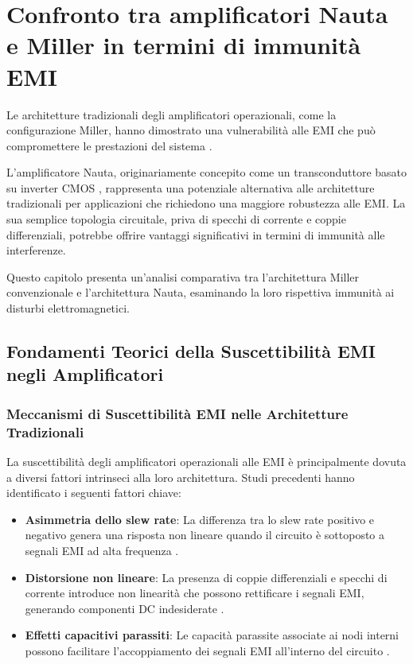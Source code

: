 \chapter{Confronto tra amplificatori Nauta e Miller in termini di immunità EMI}
\label{chap:Nauta_Miller_Comparison}

Le architetture tradizionali degli amplificatori operazionali, come la configurazione Miller, hanno dimostrato una vulnerabilità alle EMI che può compromettere le prestazioni del sistema \cite{TR2016}. 

L'amplificatore Nauta, originariamente concepito come un transconduttore basato su inverter CMOS \cite{EMI_Immunity_of_the_Nauta_Inverter-Based_Amplifier}, rappresenta una potenziale alternativa alle architetture tradizionali per applicazioni che richiedono una maggiore robustezza alle EMI. La sua semplice topologia circuitale, priva di specchi di corrente e coppie differenziali, potrebbe offrire vantaggi significativi in termini di immunità alle interferenze.

Questo capitolo presenta un'analisi comparativa tra l'architettura Miller convenzionale e l'architettura Nauta, esaminando la loro rispettiva immunità ai disturbi elettromagnetici.

\section{Fondamenti Teorici della Suscettibilità EMI negli Amplificatori}

\subsection{Meccanismi di Suscettibilità EMI nelle Architetture Tradizionali}

La suscettibilità degli amplificatori operazionali alle EMI è principalmente dovuta a diversi fattori intrinseci alla loro architettura. Studi precedenti hanno identificato i seguenti fattori chiave:

\begin{itemize}
    \item \textbf{Asimmetria dello slew rate}: La differenza tra lo slew rate positivo e negativo genera una risposta non lineare quando il circuito è sottoposto a segnali EMI ad alta frequenza \cite{finalprint}.
    
    \item \textbf{Distorsione non lineare}: La presenza di coppie differenziali e specchi di corrente introduce non linearità che possono rettificare i segnali EMI, generando componenti DC indesiderate \cite{Redoute-Richelli_EMC_Magazine}.
    
    \item \textbf{Effetti capacitivi parassiti}: Le capacità parassite associate ai nodi interni possono facilitare l'accoppiamento dei segnali EMI all'interno del circuito \cite{An_EMI-Resistant_Common-Mode_Cancelation_Differential_Input_Stage_in_UMC_180_nm_CMOS}.
\end{itemize}

